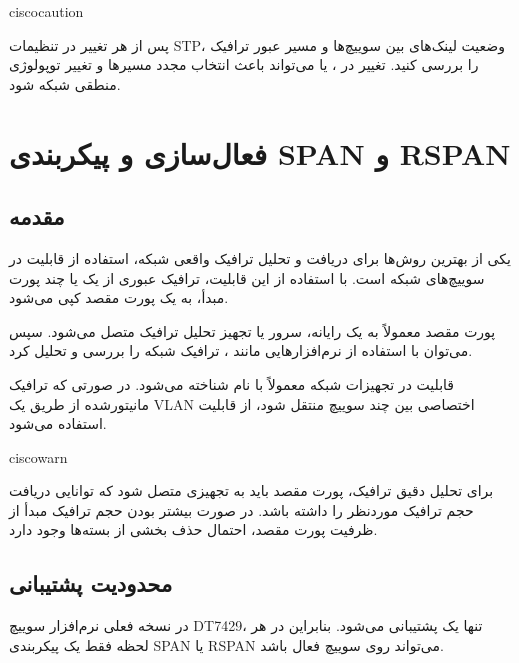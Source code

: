 \documentclass[11pt,letterpaper]{report}
\newenvironment{cautionbox}[1]{%
	\begin{noticebox}[title={\textbf{\faExclamationTriangle\ #1}}]{ciscocaution}
	}{%
	\end{noticebox}
}
\newenvironment{tipbox}[1]{%
	\begin{noticebox}[title={\textbf{\faLightbulb\ #1}}]{ciscowarn}
	}{%
	\end{noticebox}
}
\begin{document}
	\begin{cautionbox}{هشدار نهایی}
		پس از هر تغییر در تنظیمات STP، وضعیت لینک‌های بین سوییچ‌ها و
		مسیر عبور ترافیک را بررسی کنید. تغییر در ،
		 یا  می‌تواند باعث
		انتخاب مجدد مسیرها و تغییر توپولوژی منطقی شبکه شود.
	\end{cautionbox}


	\chapter{فعال‌سازی و پیکربندی SPAN و RSPAN}

	\section{مقدمه}

	یکی از بهترین روش‌ها برای دریافت و تحلیل ترافیک واقعی شبکه،
	استفاده از قابلیت  در سوییچ‌های شبکه است.
	با استفاده از این قابلیت، ترافیک عبوری از یک یا چند پورت مبدأ،
	به یک پورت مقصد کپی می‌شود.

	پورت مقصد معمولاً به یک رایانه، سرور یا تجهیز تحلیل ترافیک متصل
	می‌شود. سپس می‌توان با استفاده از نرم‌افزارهایی مانند
	، ترافیک شبکه را بررسی و تحلیل کرد.

	قابلیت  در تجهیزات شبکه معمولاً با نام
	 شناخته می‌شود. در صورتی که
	ترافیک مانیتور‌شده از طریق یک VLAN اختصاصی بین چند سوییچ منتقل
	شود، از قابلیت  استفاده می‌شود.

	\begin{tipbox}{نکته عملیاتی}
		برای تحلیل دقیق ترافیک، پورت مقصد باید به تجهیزی متصل شود که
		توانایی دریافت حجم ترافیک موردنظر را داشته باشد. در صورت بیشتر
		بودن حجم ترافیک مبدأ از ظرفیت پورت مقصد، احتمال حذف بخشی از
		بسته‌ها وجود دارد.
	\end{tipbox}


	\section{محدودیت پشتیبانی}

	در نسخه فعلی نرم‌افزار سوییچ DT7429، تنها یک
	 پشتیبانی می‌شود. بنابراین در هر لحظه فقط
	یک پیکربندی SPAN یا RSPAN می‌تواند روی سوییچ فعال باشد.
\end{document}
